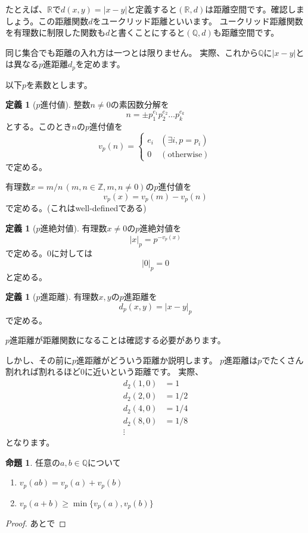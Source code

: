 \documentclass[uplatex]{jsarticle}
\newcommand{\Z}{\mathbb{Z}}
\newcommand{\Q}{\mathbb{Q}}
\newcommand{\R}{\mathbb{R}}
\theoremstyle{definition} %
\newtheorem{defi}[thm]{定義}
\newtheorem{prop}[thm]{命題}
\begin{document}
たとえば、$\R$で$d(x, y) = |x - y|$と定義すると$(\R, d)$は距離空間です。確認しましょう。この距離関数$d$をユークリッド距離といいます。
ユークリッド距離関数を有理数に制限した関数も$d$と書くことにすると$(\Q, d)$も距離空間です。

同じ集合でも距離の入れ方は一つとは限りません。
実際、これから$\Q$に$|x - y|$とは異なる$p$進距離$d_p$を定めます。

以下$p$を素数とします。

\begin{oframed}\begin{defi}[$p$進付値]
整数$n \ne 0$の素因数分解を
\[n = \pm p_1^{e_1} p_2^{e_2} \dots p_k^{e_k}\]
とする。このとき$n$の$p$進付値を
\[v_p(n) = \begin{cases}e_i & (\exists i, p = p_i) \\ 0 & (\text{otherwise}) \end{cases} \]
で定める。

有理数$x = m/n\,(m,n \in \Z, m, n \ne 0)$の$p$進付値を
\[v_p(x) = v_p(m) - v_p(n)\]
で定める。(これはwell-definedである)
\end{defi}\end{oframed}

\begin{oframed}\begin{defi}[$p$進絶対値]
有理数$x \ne 0$の$p$進絶対値を
\[|x|_p = p^{-v_p(x)}\]
で定める。$0$に対しては
\[|0|_p = 0\]
と定める。
\end{defi}\end{oframed}

\begin{oframed}\begin{defi}[$p$進距離]
有理数$x, y$の$p$進距離を
\[d_p(x, y) = |x - y|_p\]
で定める。
\end{defi}\end{oframed}

$p$進距離が距離関数になることは確認する必要があります。

しかし、その前に$p$進距離がどういう距離か説明します。
$p$進距離は$p$でたくさん割れれば割れるほど$0$に近いという距離です。
実際、
\begin{align*}
d_2(1, 0) &= 1 \\
d_2(2, 0) &= 1/2 \\
d_2(4, 0) &= 1/4 \\
d_2(8, 0) &= 1/8 \\
\vdots
\end{align*}
となります。

\begin{oframed}\begin{prop}\label{prop:1}
任意の$a, b \in \Q$について
\begin{enumerate}
\item $v_p(ab) = v_p(a) + v_p(b)$
\item $v_p(a+b) \geq \min\{v_p(a), v_p(b)\}$
\end{enumerate}
\end{prop}\end{oframed}
\begin{proof}
あとで
\end{proof}
\end{document}
